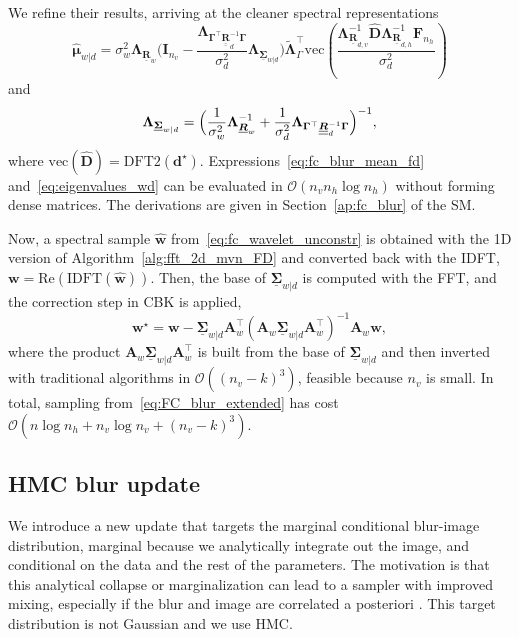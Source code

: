 \documentclass[12pt]{article}
\newcommand{\mycirc}[1] {\underline{\bm{#1}}}
\newcommand{\mybcirc}[1] {\underline{\underline{\bm{#1}}}}
\begin{document}
We refine their results, arriving at the cleaner spectral
representations
\begin{equation} \label{eq:fc_blur_mean_fd}
    \hat{\bm{\mu}}_{w|d} = \sigma_w^2 \bm{\Lambda}_{\mycirc{R}_{w}}
    \bigl(\bm{I}_{n_{v}} - \frac{\bm{\Lambda}_{\bm{\Gamma}^{\top}\mybcirc{R}_d^{-1}\bm{\Gamma}}}{\sigma_d^2}\bm{\Lambda}_{\mycirc{\Sigma}_{w|d}}\bigr)
    \tilde{\bm{\Lambda}}_{\Gamma}^{\top} \mbox{vec}(\frac{\bm{\Lambda}_{\mycirc{R}_{d, v}}^{-1} \hat{\bm{D}}\bm{\Lambda}_{\mycirc{R}_{d, h}}^{-1} \bm{F}_{n_{h}}}{\sigma_d^2})
\end{equation}
and
\begin{equation} \label{eq:eigenvalues_wd}
    \bm{\Lambda}_{\mycirc{\Sigma}_{w|d}}
    = \Bigl(\frac{1}{\sigma_w^2}\bm{\Lambda}_{\mycirc{R}_{w}}^{-1}
        + \frac{1}{\sigma_d^2}\bm{\Lambda}_{\bm{\Gamma}^{\top}\mybcirc{R}_d^{-1}\bm{\Gamma}}
      \Bigr)^{-1},
\end{equation}
where $\mbox{vec}(\hat{\bm{D}})=\mbox{DFT2}(\bm{d}^\star)$. 
Expressions~\eqref{eq:fc_blur_mean_fd} and~\eqref{eq:eigenvalues_wd} can be evaluated in $\mathcal{O}(n_v n_h \log n_h)$ without forming dense matrices. The derivations are given in Section~\ref{ap:fc_blur} of the SM.

Now, a spectral sample $\hat{\bm{w}}$ from~\eqref{eq:fc_wavelet_unconstr} is obtained with the 1D version of Algorithm~\ref{alg:fft_2d_mvn_FD} and converted back with the IDFT, $\bm{w} = \mbox{Re}(\mbox{IDFT}(\hat{\bm{w}}))$. Then, the base of $\mycirc{\Sigma}_{w|d}$ is computed with the FFT, and the correction step in CBK is applied, 
\begin{equation*} \label{eq:fc_wavelet_cbk}
\bm{w}^{\star} = \bm{w}- \mycirc{\Sigma}_{w|d} \bm{A}_{w}^{\top}(\bm{A}_{w} \mycirc{\Sigma}_{w|d} \bm{A}_{w}^{\top})^{-1} \bm{A}_{w} \bm{w},
\end{equation*}
where the product $\bm{A}_{w} \mycirc{\Sigma}_{w|d} \bm{A}_{w}^{\top}$ is built from the base of $\mycirc{\Sigma}_{w|d}$ and then inverted with traditional algorithms in $\mathcal{O}((n_v-k)^3)$, feasible because $n_v$ is small. In total, sampling from~\eqref{eq:FC_blur_extended} has cost $\mathcal{O}(n \log n_h + n_v \log n_v + (n_v - k)^3)$.

\subsection{HMC blur update}
We introduce a new update that targets the marginal conditional blur-image distribution, marginal because we analytically integrate out the image, and conditional on the data and the rest of the parameters. The motivation is that this analytical collapse or marginalization can lead to a sampler with improved mixing, especially if the blur and image are correlated a posteriori \citet{Liu2008}. This target distribution is not Gaussian and we use HMC. 
\end{document}
